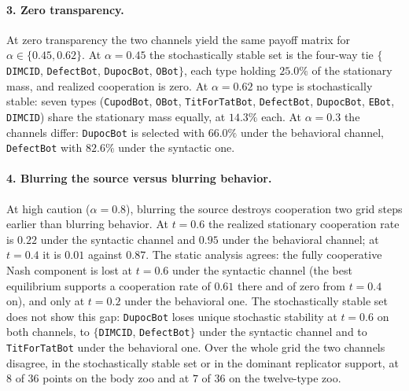 \paragraph{3. Zero transparency.}
At zero transparency the two channels yield the same payoff matrix for $\alpha\in\{0.45,0.62\}$. At $\alpha=0.45$ the stochastically stable set is the four-way tie $\{$\texttt{DIMCID}, \texttt{DefectBot}, \texttt{DupocBot}, \texttt{OBot}$\}$, each type holding $25.0\%$ of the stationary mass, and realized cooperation is zero. At $\alpha=0.62$ no type is stochastically stable: seven types (\texttt{CupodBot}, \texttt{OBot}, \texttt{TitForTatBot}, \texttt{DefectBot}, \texttt{DupocBot}, \texttt{EBot}, \texttt{DIMCID}) share the stationary mass equally, at $14.3\%$ each. At $\alpha=0.3$ the channels differ: \texttt{DupocBot} is selected with $66.0\%$ under the behavioral channel, \texttt{DefectBot} with $82.6\%$ under the syntactic one.
%
\paragraph{4. Blurring the source versus blurring behavior.}
At high caution ($\alpha=0.8$), blurring the source destroys cooperation two grid steps earlier than blurring behavior. At $t=0.6$ the realized stationary cooperation rate is $0.22$ under the syntactic channel and $0.95$ under the behavioral channel; at $t=0.4$ it is $0.01$ against $0.87$. The static analysis agrees: the fully cooperative Nash component is lost at $t=0.6$ under the syntactic channel (the best equilibrium supports a cooperation rate of $0.61$ there and of zero from $t=0.4$ on), and only at $t=0.2$ under the behavioral one.
The stochastically stable set does not show this gap: \texttt{DupocBot} loses unique stochastic stability at $t=0.6$ on both channels, to $\{$\texttt{DIMCID}, \texttt{DefectBot}$\}$ under the syntactic channel and to \texttt{TitForTatBot} under the behavioral one. Over the whole grid the two channels disagree, in the stochastically stable set or in the dominant replicator support, at $8$ of $36$ points on the body zoo and at $7$ of $36$ on the twelve-type zoo.
%
